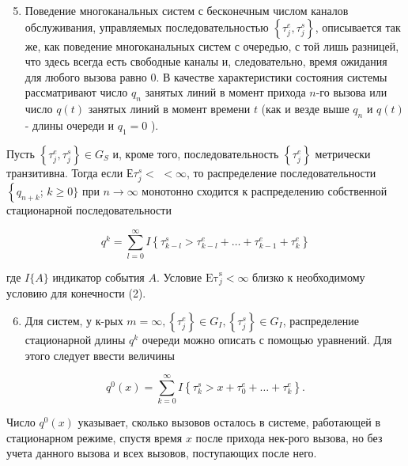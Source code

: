 \documentclass[10pt]{article}
\begin{document}
\begin{enumerate}

  \setcounter{enumi}{4}

  \item Поведение многоканальных систем с бесконечным числом каналов обслуживания, управляемых последовательностью $\left\{\tau_{j}^{e}, \tau_{j}^{s}\right\}$, описывается так же, как поведение многоканальных систем с очередью, с той лишь разницей, что здесь всегда есть свободные каналы и, следовательно, время ожидания для любого вызова равно 0. В качестве характеристики состояния системы рассматривают число $q_{n}$ занятых линий в момент прихода $n$-го вызова или число $q(t)$ занятых линий в момент времени $t$ (как и везде выше $q_{n}$ и $q(t)$ - длины очереди и $q_{1}=0$ ).

\end{enumerate}



Пусть $\left\{\tau_{j}^{e}, \tau_{j}^{s}\right\} \in G_{S}$ и, кроме того, последовательность $\left\{\tau_{j}^{e}\right\}$ метрически транзитивна. Тогда если $Е \tau_{j}^{s}<$ $<\infty$, то распределение последовательности $\left\{q_{n+k}\right.$; $k \geqslant 0\}$ при $n \rightarrow \infty$ монотонно сходится к распределению собственной стационарной последовательности



\[

q^{k}=\sum_{l=0}^{\infty} I\left\{\tau_{k-l}^{s}>\tau_{k-l}^{e}+\ldots+\tau_{k-1}^{e}+\tau_{k}^{e}\right\}

\]



где $I\{A\}$ индикатор события $A$. Условие $\mathrm{E \tau}_{j}^{\mathrm{s}}<\infty$ близко к необходимому условию для конечности (2).



\begin{enumerate}

  \setcounter{enumi}{5}

  \item Для систем, у к-рых $m=\infty,\left\{\tau_{j}^{e}\right\} \in G_{I},\left\{\tau_{j}^{s}\right\} \in G_{I}$, распределение стационарной длины $q^{k}$ очереди можно описать с помощью уравнений. Для этого следует ввести величины

\end{enumerate}



\[

q^{0}(x)=\sum_{k=0}^{\infty} I\left\{\tau_{k}^{s}>x+\tau_{0}^{e}+\ldots+\tau_{k}^{e}\right\} .

\]



Число $q^{0}(x)$ указывает, сколько вызовов осталось в системе, работающей в стационарном режиме, спустя время $x$ после прихода нек-рого вызова, но без учета данного вызова и всех вызовов, поступающих после него.
\end{document}
